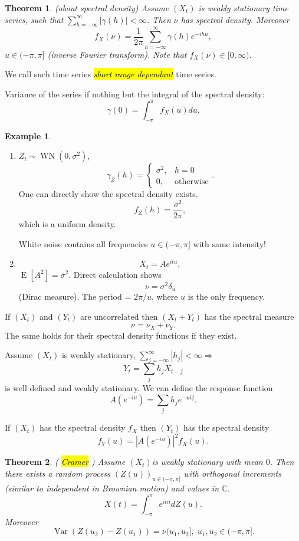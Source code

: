 \documentclass[12pt,a4paper, notitlepage]{book}
\newcommand{\hlc}[2][yellow]{ {\sethlcolor{#1} \hl{#2}} }
\theoremstyle{definition} %
\newtheorem{example}{Example}[chapter]
\theoremstyle{plain} %
\newtheorem{theorem}{Theorem}
\newcommand{\C}{\mathbb C}
\DeclareMathOperator{\Var}{Var}
\DeclareMathOperator{\E}{E}
\DeclareMathOperator{\Wn}{WN}
\newcommand{\Important}[1]{ {\it \hlc{#1} } }
\begin{document}
\begin{theorem} (about spectral density)
Assume $(X_t)$ is weakly stationary time series, such that $\sum_{h =-\infty }^\infty|\gamma(h)| < \infty$. Then $\nu$ has spectral density. Moreover 
\[ f_X(\nu) = \frac{1}{2 \pi} \sum_{h = -\infty}^\infty\gamma(h) e^{-i h u}, \]
$ u\in (-\pi, \pi]$ (inverse Fourier transform). Note that $f_X(\nu) \in [0, \infty)$. 
\end{theorem}
We call such time series \Important{short range dependant} time series. 

Variance of the series if nothing but the integral of the spectral density: 
\[ \gamma(0) = \int_{-\pi}^\pi f_X(u)du. \]

\begin{example}
\begin{enumerate}
\item $Z_t \sim \Wn(0, \sigma^2)$, 
\[ \gamma_Z(h) = \begin{cases} \sigma^2, & h = 0 \\ 0, & \text{otherwise} \end{cases} . \]
 One can directly show the spectral density exists. 
\[ f_Z(h) = \frac{\sigma^2}{2 \pi}, \]
 which is a uniform density. 

White noise contains all frequencies $u \in (-\pi, \pi]$ with same intensity! 
\item  
\[ X_t = A e^{i t u}, \] 
$ \E[ A^2 ] = \sigma^2$. Direct calculation shows 
\[ \nu = \sigma^2 \delta_u \] (Dirac measure). The period = $2 \pi / u$, where $u$ is the only frequency. 
\end{enumerate}
\vskip0.5cm

If $(X_t)$ and $(Y_t)$ are uncorrelated then  $(X_t + Y_t)$ has the spectral measure 
\[ \nu = \nu_X + \nu_Y. \]
 The same holds for their spectral density functions if they exist. 

Assume $(X_t)$ is weakly stationary, $\sum_{j=-\infty}^\infty |h_j| < \infty \Rightarrow $ 
\[ Y_t = \sum_j h_j X_{t-j} \]
 is well defined and weakly stationary. We can define the response function 
\[ A(e^{-iu}) = \sum_j h_j e^{-u i j}. \]

If $(X_t)$ has the spectral density $f_X$ then $(Y_t)$ has the spectral density 
\[ f_Y(u) = |A(e^{-iu})|^2 f_X(u) . \] 

\begin{theorem} (\Important{Cramer})
Assume $(X_t)$is weakly stationary with mean $0$. Then there exists a random process $(Z(u))_{u \in(-\pi, \pi]}$ with 
orthogonal increments (similar to independent in Brownian motion) and values in $\C$. 
\[ X(t) = \int_{-\pi}^\pi e^{i t n}dZ(u) . \]
Moreover 
\[ \Var(Z(u_2) - Z(u_1)) = \nu(u_1, u_2], \; u_1, u_2 \in (-\pi,\pi]. \]


\end{theorem}
\end{example}
\end{document}
